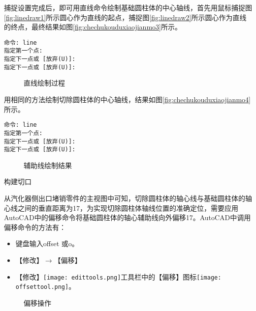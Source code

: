 \begin{procedure}
捕捉设置完成后，即可用直线命令绘制基础圆柱体的中心轴线，首先用鼠标捕捉图\ref{fig:linedraw1}所示圆心作为直线的起点，捕捉图\ref{fig:linedraw2}所示圆心作为直线的终点，最终结果如图\ref{fig:chechukouduxiaojianmo3}所示。
\begin{lstlisting}
命令: line
指定第一个点:
指定下一点或 [放弃(U)]: 
指定下一点或 [放弃(U)]:
\end{lstlisting}

\begin{figure}[htbp]%
\centering
{}\hspace{20pt}
\caption{直线绘制过程}
\end{figure}

用相同的方法绘制切除圆柱体的中心轴线，结果如图\ref{fig:chechukouduxiaojianmo4}所示。
\begin{lstlisting}
命令: line
指定第一个点:
指定下一点或 [放弃(U)]:
指定下一点或 [放弃(U)]:
\end{lstlisting}

\begin{figure}[htbp]%
\centering
{}\hspace{20pt}
\caption{辅助线绘制结果}
\end{figure}

\item 构建切口

从汽化器侧出口堵销零件的主视图中可知，切除圆柱体的轴心线与基础圆柱体的轴心线之间的垂直距离为17，为实现切除圆柱体轴线位置的准确定位，需要应用AutoCAD中的偏移命令将基础圆柱体的轴心辅助线向外偏移17。AutoCAD中调用偏移命令的方法有：

\begin{itemize}
\item 键盘输入offset 或o。
\item 【修改】$\rightarrow$【偏移】
\item 【修改】\texttt{[image: edittools.png]}工具栏中的【偏移】图标\texttt{[image: offsettool.png]}。
\end{itemize}

\begin{figure}[htbp]%
\centering
{}\hspace{20pt}
\caption{偏移操作}
\end{figure}


\end{procedure}
